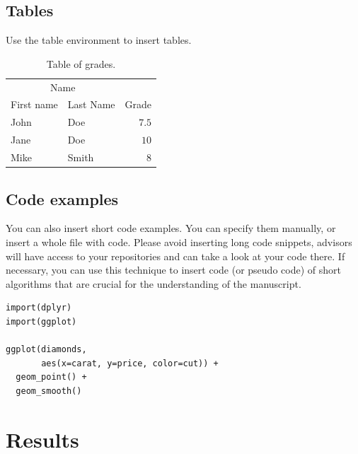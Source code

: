 \documentclass[fleqn,moreauthors,10pt]{ds_report}
\begin{document}
\subsection*{Tables}

Use the table environment to insert tables.

\begin{table}[hbt]
	\caption{Table of grades.}
	\centering
	\begin{tabular}{l l | r}
		\toprule
		\multicolumn{2}{c}{Name} \\
		\cmidrule(r){1-2}
		First name & Last Name & Grade \\
		\midrule
		John & Doe & $7.5$ \\
		Jane & Doe & $10$ \\
		Mike & Smith & $8$ \\
		\bottomrule
	\end{tabular}
	\label{tab:label}
\end{table}


\subsection*{Code examples}

You can also insert short code examples. You can specify them manually, or insert a whole file with code. Please avoid inserting long code snippets, advisors will have access to your repositories and can take a look at your code there. If necessary, you can use this technique to insert code (or pseudo code) of short algorithms that are crucial for the understanding of the manuscript.

\lstset{language=Python}


\lstset{language=R}
\begin{lstlisting}
import(dplyr)
import(ggplot)

ggplot(diamonds,
	   aes(x=carat, y=price, color=cut)) +
  geom_point() +
  geom_smooth()
\end{lstlisting}


\section*{Results}
\end{document}
